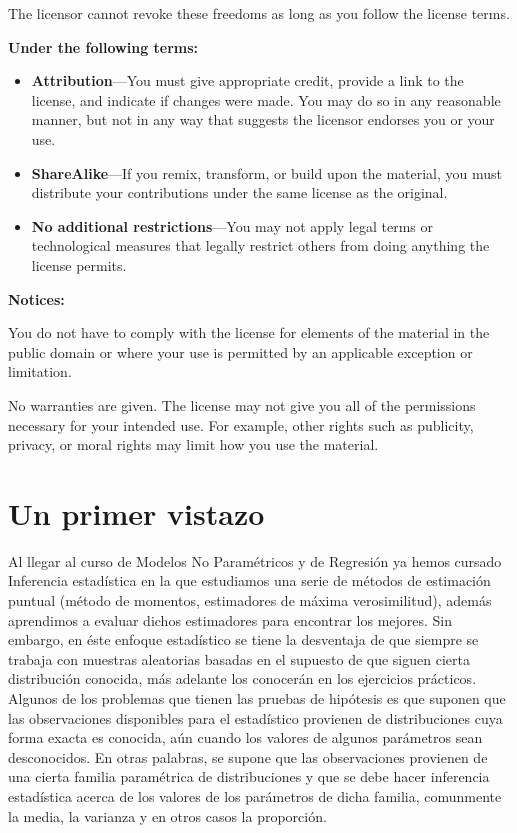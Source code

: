 \documentclass[a4paper,oneside,openany]{book}
\begin{document}
The licensor cannot revoke these freedoms as long as you follow the
license terms.

\textbf{Under the following terms:}

\begin{itemize}
\item
  \textbf{Attribution}---You must give appropriate credit, provide a
  link to the license, and indicate if changes were made. You may do so
  in any reasonable manner, but not in any way that suggests the
  licensor endorses you or your use.
\item
  \textbf{ShareAlike}---If you remix, transform, or build upon the
  material, you must distribute your contributions under the same
  license as the original.
\item
  \textbf{No additional restrictions}---You may not apply legal terms or
  technological measures that legally restrict others from doing
  anything the license permits.
\end{itemize}

\textbf{Notices:}

You do not have to comply with the license for elements of the material
in the public domain or where your use is permitted by an applicable
exception or limitation.

No warranties are given. The license may not give you all of the
permissions necessary for your intended use. For example, other rights
such as publicity, privacy, or moral rights may limit how you use the
material.

\part{Un primer vistazo}\label{part-un-primer-vistazo}

Al llegar al curso de Modelos No Paramétricos y de Regresión ya hemos
cursado Inferencia estadística en la que estudiamos una serie de métodos
de estimación puntual (método de momentos, estimadores de máxima
verosimilitud), además aprendimos a evaluar dichos estimadores para
encontrar los mejores. Sin embargo, en éste enfoque estadístico se tiene
la desventaja de que siempre se trabaja con muestras aleatorias basadas
en el supuesto de que siguen cierta distribución conocida, más adelante
los conocerán en los ejercicios prácticos. Algunos de los problemas que
tienen las pruebas de hipótesis es que suponen que las observaciones
disponibles para el estadístico provienen de distribuciones cuya forma
exacta es conocida, aún cuando los valores de algunos parámetros sean
desconocidos. En otras palabras, se supone que las observaciones
provienen de una cierta familia paramétrica de distribuciones y que se
debe hacer inferencia estadística acerca de los valores de los
parámetros de dicha familia, comunmente la media, la varianza y en otros
casos la proporción.
\end{document}
